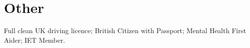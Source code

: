 \section{Other}
\runsubsection{}


\location{}

Full clean UK driving licence; British Citizen with Passport; Mental Health First Aider; IET Member.
%
%
%

\sectionsep{}
